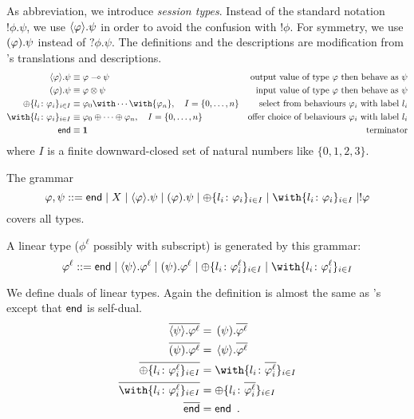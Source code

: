     As abbreviation, we introduce \textit{session
    types}.
    Instead of the standard notation $!\phi.\psi$, we use
    $\langle{\varphi}\rangle.{\psi}$ in order to avoid the confusion with
    $!\phi$.
    For symmetry, we use $(\varphi).{\psi}$ instead of $?\phi.\psi$.
    The definitions and the descriptions are modification from
    \citet{wadler2012propositions}'s translations and descriptions.
    \begin{align*}
     \sendtype\phi\psi&\equiv \phi\limp\psi &\text{output value of type $\phi$ then behave as $\psi$} \\
     \recvtype\phi\psi&\equiv \phi\otimes\psi &\text{input value of type $\phi$ then behave as $\psi$}\\
     \oplus\{l_i\colon \phi_i\}_{i\in I} &\equiv {\phi_0}\with
     \cdots \with {\phi_n}, \quad I = \{0,\ldots,n\} & \text{select from behaviours
     $\phi_i$ with label $l_i$}\\
     \with\{l_i\colon \phi_i\}_{i\in I} &\equiv {\phi_0}\oplus
     \cdots \oplus {\phi_n}, \quad I = \{0,\ldots,n\}& \text{offer choice of
     behaviours $\phi_i$ with label $l_i$}
     \\
     \terminate &\equiv \one &\text{terminator}
    \end{align*}
    where $I$ is a finite downward-closed set of natural numbers like
    $\{0,1,2,3\}$.


    The grammar
    \[
     \phi,\psi ::= \terminate\mid X \mid \sendtype\phi\psi \mid
     \recvtype\phi\psi
     \mid \oplus\{l_i\colon\phi_i\}_{i\in I}
     \mid \with\{l_i\colon\phi_i\}_{i\in I}
     \mid !\phi
    \]
    covers all types.

    A linear type ($\phi^\ell$ possibly with subscript) is generated by
    this grammar:
    \[
     \phi^\ell ::= \terminate\mid
     \sendtype{\psi}{\phi^\ell} \mid
     \recvtype{\psi}{\phi^\ell}
     \mid \oplus\{l_i\colon\phi^\ell_i\}_{i\in I}
     \mid \with\{l_i\colon\phi^\ell_i\}_{i\in I}
    \]

    We define duals of linear types.
    Again the definition is almost the
    same as \citet{wadler2012propositions}'s except that $\mathsf{end}$ is
    self-dual.
    \begin{align*}
     \overline{\sendtype\psi{\phi^\ell}}&= \,\recvtype\psi{\overline{\phi^\ell}}\\
     \overline{\recvtype\psi{\phi^\ell}}&= \,\sendtype\psi{\overline{\phi^\ell}}\\
     \overline{\oplus\{l_i\colon \phi^\ell_i\}_{i\in I}} &=
     \with\{l_i\colon \overline{\phi^\ell_i}\}_{i\in I} \\
     \overline{\with\{l_i\colon \phi^\ell_i\}_{i\in I}} &=
     \oplus\{l_i\colon \overline{\phi^\ell_i}\}_{i\in I} \\
     \overline{\terminate} &= \terminate\enspace.
    \end{align*}

